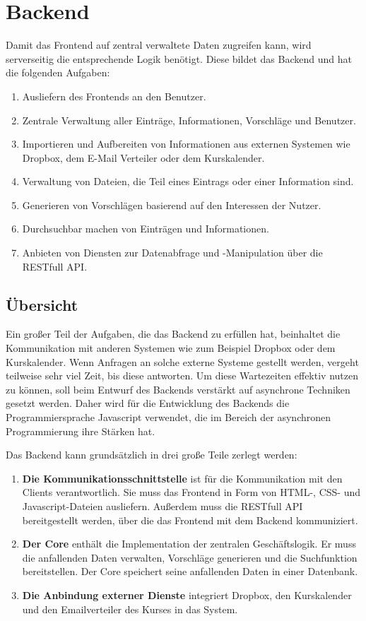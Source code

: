 \chapter{Backend} %
\label{cha:backend}
	Damit das Frontend auf zentral verwaltete Daten zugreifen kann, wird serverseitig die entsprechende Logik benötigt. Diese bildet das Backend und hat die folgenden Aufgaben:

	\begin{enumerate}
		\item Ausliefern des Frontends an den Benutzer.
		\item Zentrale Verwaltung aller Einträge, Informationen, Vorschläge und Benutzer.
		\item Importieren und Aufbereiten von Informationen aus externen Systemen wie Dropbox, dem E-Mail Verteiler oder dem Kurskalender.
		\item Verwaltung von Dateien, die Teil eines Eintrags oder einer Information sind.
		\item Generieren von Vorschlägen basierend auf den Interessen der Nutzer.
		\item Durchsuchbar machen von Einträgen und Informationen.
		\item Anbieten von Diensten zur Datenabfrage und -Manipulation über die RESTfull API.
	\end{enumerate}

	\section{Übersicht} %
	\label{sec:ubersicht}
		Ein großer Teil der Aufgaben, die das Backend zu erfüllen hat, beinhaltet die Kommunikation mit anderen Systemen wie zum Beispiel Dropbox oder dem Kurskalender. Wenn Anfragen an solche externe Systeme gestellt werden, vergeht teilweise sehr viel Zeit, bis diese antworten. Um diese Wartezeiten effektiv nutzen zu können, soll beim Entwurf des Backends verstärkt auf asynchrone Techniken gesetzt werden. Daher wird für die Entwicklung des Backends die Programmiersprache Javascript verwendet, die im Bereich der asynchronen Programmierung ihre Stärken hat. %

		Das Backend kann grundsätzlich in drei große Teile zerlegt werden: 
		\begin{enumerate}
			\item \textbf{Die Kommunikationsschnittstelle} ist für die Kommunikation mit den Clients verantwortlich. Sie muss das Frontend in Form von HTML-, CSS- und Javascript-Dateien ausliefern. Außerdem muss die RESTfull API bereitgestellt werden, über die das Frontend mit dem Backend kommuniziert.
			\item \textbf{Der Core} enthält die Implementation der zentralen Geschäftslogik. Er muss die anfallenden Daten verwalten, Vorschläge generieren und die Suchfunktion bereitstellen. Der Core speichert seine anfallenden Daten in einer Datenbank.
			\item \textbf{Die Anbindung externer Dienste} integriert Dropbox, den Kurskalender und den Emailverteiler des Kurses in das System.
		\end{enumerate}

